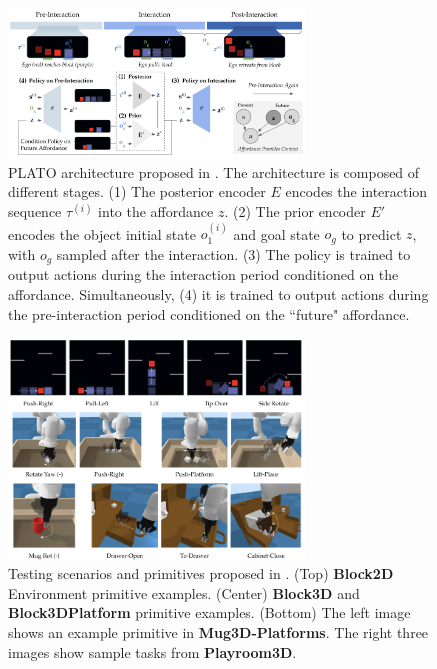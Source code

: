 \begin{figure}[t]
    \centering
    \includegraphics[width=0.7\textwidth]{figures/images/plato/plato.png}
    \caption{PLATO architecture proposed in \cite{belkhale2023plato}. The architecture is composed of different stages. (1) The posterior encoder \( E \) encodes the interaction sequence \( \tau^{(i)} \) into the affordance \( z \). (2) The prior encoder \( E' \) encodes the object initial state \( o^{(i)}_1 \) and goal state \( o_g \) to predict \( z \), with \( o_g \) sampled after the interaction. (3) The policy is trained to output actions during the interaction period conditioned on the affordance. Simultaneously, (4) it is trained to output actions during the pre-interaction period conditioned on the ``future" affordance.
    }
    \label{fig:plato}
    
\end{figure}

\begin{figure}[t]
    \centering
    \includegraphics[width=0.7\textwidth]{figures/images/plato/tasks.png}
    \caption{ Testing scenarios and primitives proposed in \cite{belkhale2023plato}. (Top) \textbf{Block2D} Environment primitive examples. (Center) \textbf{Block3D} and \textbf{Block3DPlatform} primitive examples. (Bottom) The left image shows an example primitive in \textbf{Mug3D-Platforms}. The right three images show sample tasks from \textbf{Playroom3D}.}
    \label{fig:plato_task}
    
\end{figure}